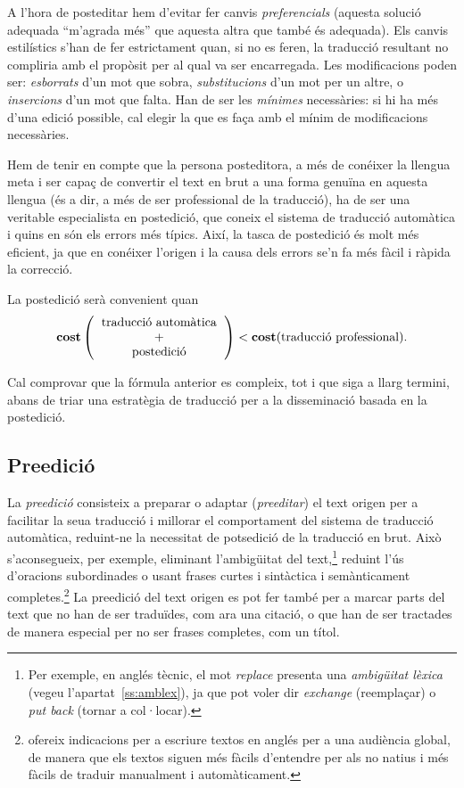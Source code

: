 A l'hora de posteditar hem d'evitar fer canvis \emph{preferencials}
(aquesta solució adequada ``m'agrada més'' que aquesta altra que també
és adequada). Els canvis estilístics s'han de fer estrictament quan,
si no es feren, la traducció resultant no compliria amb el propòsit
per al qual va ser encarregada.  Les modificacions poden ser:
\emph{esborrats} d'un mot que sobra, \emph{substitucions} d'un mot per
un altre, o \emph{insercions} d'un mot que falta. Han de ser les
\emph{mínimes} necessàries: si hi ha més d'una edició possible, cal
elegir la que es faça amb el mínim de modificacions necessàries.

Hem de tenir en compte que la persona posteditora, a més de conéixer
la llengua meta i ser capaç de convertir el text en brut a una forma
genuïna en aquesta llengua (és a dir, a més de ser professional de la
traducció), ha de ser una veritable especialista en postedició, que
coneix el sistema de traducció automàtica i quins en són els errors
més típics. Així, la tasca de postedició és molt més eficient, ja que
en conéixer l'origen i la causa dels errors se'n fa més fàcil i ràpida
la correcció.

La postedició serà convenient quan
$$\textbf{cost}\left(\mbox{\begin{tabular}{c}traducció automàtica\\ +\\
      postedició\end{tabular}}\right) <
\textbf{cost}(\mbox{traducció professional}).
$$
\label{pg:cost}

Cal comprovar que la fórmula anterior es compleix, tot i que siga a
llarg termini, abans de triar una estratègia de traducció per a la
disseminació basada en la postedició.

\subsection{Preedició} 
\label{ss:preedicio}
La \emph{preedició} consisteix a preparar o adaptar (\emph{preeditar})
el text origen per a facilitar la seua traducció i millorar el
comportament del sistema de traducció automàtica, reduint-ne la
necessitat de potsedició de la traducció en brut. Això s'aconsegueix,
per exemple, eliminant l'ambigüitat del text,\footnote{Per exemple, en
  anglés tècnic, el mot \emph{replace} presenta una \emph{ambigüitat
    lèxica} (vegeu l'apartat~\ref{ss:amblex}), ja que pot voler dir
  \emph{exchange} (reemplaçar) o \emph{put back} (tornar a
  col·locar).} reduint l'ús d'oracions subordinades o usant frases
curtes i sintàctica i semànticament completes.\footnote{\citet{kohl08}
  ofereix indicacions per a escriure textos en anglés per a una
  audiència global, de manera que els textos siguen més fàcils
  d'entendre per als no natius i més fàcils de traduir manualment i
  automàticament.} La preedició del text origen es pot fer també per a
marcar parts del text que no han de ser traduïdes, com ara una
citació, o que han de ser tractades de manera especial per no ser
frases completes, com un títol.

